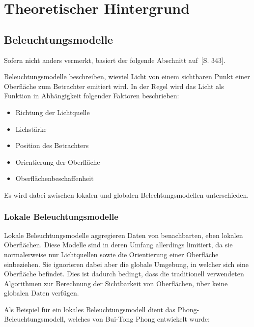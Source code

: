 
\chapter{Theoretischer Hintergrund}
\label{chap:theoretical_background}

\section{Beleuchtungsmodelle}
\label{sec:illumination_models}

Sofern nicht anders vermerkt, basiert der folgende Abschnitt auf~\cite{whitted_improved_1980}[S. 343].

Beleuchtungsmodelle beschreiben, wieviel Licht von einem sichtbaren Punkt einer Oberfläche zum Betrachter emitiert wird. In der Regel wird das Licht als Funktion in Abhängigkeit folgender Faktoren beschrieben:
\begin{itemize}
    \item Richtung der Lichtquelle
    \item Lichstärke
    \item Position des Betrachters
    \item Orientierung der Oberfläche
    \item Oberflächenbeschaffenheit
\end{itemize}

Es wird dabei zwischen lokalen und globalen Belechtungsmodellen unterschieden.

\subsection{Lokale Beleuchtungsmodelle}
\label{subsec:local_illumination_models}

Lokale Beleuchtungsmodelle aggregieren Daten von benachbarten, eben lokalen Oberflächen. Diese Modelle sind in deren Umfang allerdings limitiert, da sie normalerweise nur Lichtquellen sowie die Orientierung einer Oberfläche einbeziehen. Sie ignorieren dabei aber die globale Umgebung, in welcher sich eine Oberfläche befindet.
Dies ist dadurch bedingt, dass die traditionell verwendeten Algorithmen zur Berechnung der Sichtbarkeit von Oberflächen, über keine globalen Daten verfügen.

Als Beispiel für ein lokales Beleuchtungsmodell dient das Phong-Beleuchtungsmodell, welches von Bui-Tong Phong entwickelt wurde:

